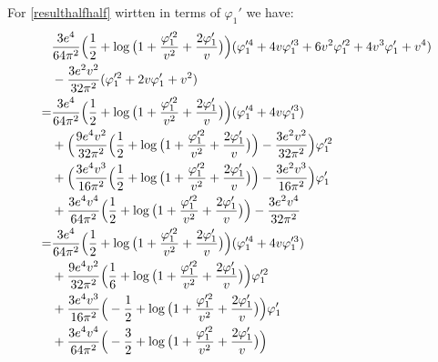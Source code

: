 For \ref{resulthalfhalf} wirtten in terms of $\varphi_1'$ we have:
\begin{align}
&\frac{3e^4}{64\pi^2}\Big(\frac{1}{2}+\log\big(1+\frac{\varphi_1'^2}{v^2}+\frac{2\varphi_1'}{v}\big)
\Big)(\varphi_1'^4 + 4v\varphi_1'^3+6v^2\varphi_1'^2+4v^3\varphi_1'+v^4) \notag\\
&-\frac{3e^2v^2}{32\pi^2}(\varphi_1'^2+2v\varphi_1'+v^2) \\
= &\frac{3e^4}{64\pi^2}\Big(\frac{1}{2}+\log\big(1+\frac{\varphi_1'^2}{v^2}+
\frac{2\varphi_1'}{v}\big)
\Big)(\varphi_1'^4 + 4v\varphi_1'^3) \\
&+\Big(\frac{9e^4v^2}{32\pi^2}\Big(\frac{1}{2}+\log\big(1+\frac{\varphi_1'^2}{v^2}+
\frac{2\varphi_1'}{v}\big)\Big)-\frac{3e^2v^2}{32\pi^2}\Big)\varphi_1'^2 \notag\\
&+\Big(\frac{3e^4v^3}{16\pi^2}\Big(\frac{1}{2}+\log\big(1+\frac{\varphi_1'^2}{v^2}+
\frac{2\varphi_1'}{v}\big)\Big)-\frac{3e^2v^3}{16\pi^2}\Big)\varphi_1' \notag\\
&+\frac{3e^4v^4}{64\pi^2}\Big(\frac{1}{2}+\log\big(1+\frac{\varphi_1'^2}{v^2}+
\frac{2\varphi_1'}{v}\big)\Big)-\frac{3e^2v^4}{32\pi^2} \\
= &\frac{3e^4}{64\pi^2}\Big(\frac{1}{2}+\log\big(1+\frac{\varphi_1'^2}{v^2}+
\frac{2\varphi_1'}{v}\big)
\Big)(\varphi_1'^4 + 4v\varphi_1'^3) \\
&+\frac{9e^4v^2}{32\pi^2}\Big(\frac{1}{6}+\log\big(1+\frac{\varphi_1'^2}{v^2}+
\frac{2\varphi_1'}{v}\big)\Big)\varphi_1'^2 \notag\\
&+\frac{3e^4v^3}{16\pi^2}\Big(-\frac{1}{2}+\log\big(1+\frac{\varphi_1'^2}{v^2}+
\frac{2\varphi_1'}{v}\big)\Big)\varphi_1' \notag\\
&+\frac{3e^4v^4}{64\pi^2}\Big(-\frac{3}{2}+\log\big(1+\frac{\varphi_1'^2}{v^2}+
\frac{2\varphi_1'}{v}\big)\Big)
\end{align}


